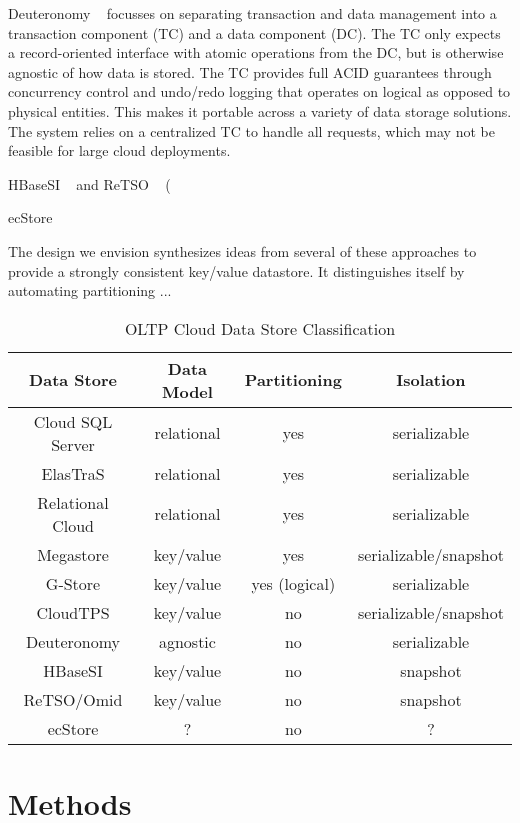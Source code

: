 \documentclass[10pt,final,journal]{IEEEtran}
\begin{document}
Deuteronomy ~\cite{Levandoski:2011:8530161} focusses on separating transaction and data management into a transaction component (TC) and a data component (DC). The TC only expects a record-oriented interface with atomic operations from the DC, but is otherwise agnostic of how data is stored. The TC provides full ACID guarantees through concurrency control and undo/redo logging that operates on logical as opposed to physical entities. This makes it portable across a variety of data storage solutions. The system relies on a centralized TC to handle all requests, which may not be feasible for large cloud deployments.

HBaseSI ~\cite{} and ReTSO ~\cite{} (

ecStore ~\cite{}

The design we envision synthesizes ideas from several of these approaches to provide a strongly consistent key/value datastore. It distinguishes itself by automating partitioning ...

\begin{table}[!t]
\renewcommand{\arraystretch}{1.3}
\caption{OLTP Cloud Data Store Classification}
\label{classification}
\centering
\begin{tabular}{|c|c|c|c|}
\hline
\bfseries Data Store  & \bfseries Data Model & \bfseries  Partitioning & \bfseries Isolation \\
\hline
\hline
Cloud SQL Server & relational & yes & serializable \\
ElasTraS & relational & yes & serializable \\
Relational Cloud & relational & yes & serializable \\
Megastore & key/value & yes & serializable/snapshot \\
G-Store & key/value & yes (logical) & serializable \\
CloudTPS & key/value & no & serializable/snapshot \\
Deuteronomy & agnostic & no &serializable \\
HBaseSI & key/value & no & snapshot \\
ReTSO/Omid & key/value & no & snapshot \\
ecStore & ? & no & ? \\
\hline
\end{tabular}
\end{table}





\section{Methods}
\end{document}

